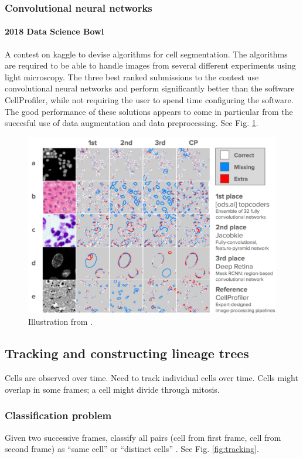 \documentclass[11pt]{article} %
\begin{document}
    \subsubsection{Convolutional neural networks}
       \paragraph{2018 Data Science Bowl \cite{marks:bowl}}
A contest on kaggle to devise algorithms for cell segmentation. The algorithms are required to be able to handle images from several different experiments using light microscopy. The three best ranked submissions to the contest use convolutional neural networks and perform significantly better than the software CellProfiler, while not requiring the user to spend time configuring the software. The good performance of these solutions appears to come in particular from the succesful use of data augmentation and data preprocessing. See Fig. \ref{fig:bowl}.
\begin{figure}[h!]
  \centering
  \includegraphics[width= \linewidth ]{bowl.png}
  \caption{Illustration from \cite{marks:bowl}.}
  \label{fig:bowl}
\end{figure}



  \subsection{Tracking and constructing lineage trees}
Cells are observed over time. Need to track individual cells over time. Cells might overlap in some frames; a cell might divide through mitosis.
    \subsubsection{Classification problem}
Given two successive frames, classify all pairs (cell from first frame, cell from second frame) as ``same cell'' or ``distinct cells'' \cite{kan:machine}. See Fig. \ref{fig:tracking}.
\end{document}

